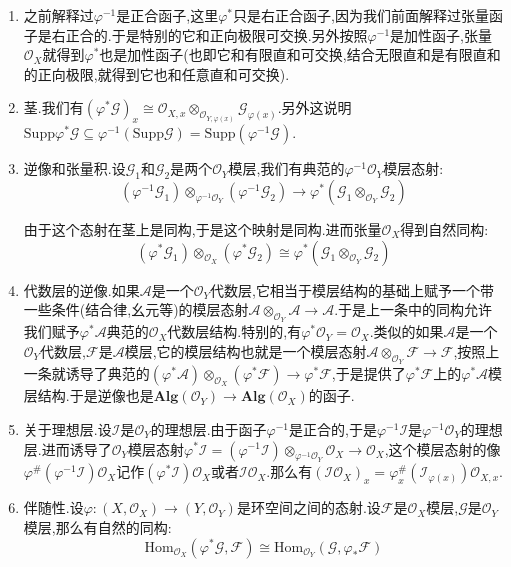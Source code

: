 \begin{enumerate}
	\item 之前解释过$\varphi^{-1}$是正合函子,这里$\varphi^*$只是右正合函子,因为我们前面解释过张量函子是右正合的.于是特别的它和正向极限可交换.另外按照$\varphi^{-1}$是加性函子,张量$\mathscr{O}_X$就得到$\varphi^*$也是加性函子(也即它和有限直和可交换,结合无限直和是有限直和的正向极限,就得到它也和任意直和可交换).
	\item 茎.我们有$(\varphi^*\mathscr{G})_x\cong\mathscr{O}_{X,x}\otimes_{\mathscr{O}_{Y,\varphi(x)}}\mathscr{G}_{\varphi(x)}$.另外这说明$\mathrm{Supp}\varphi^*\mathscr{G}\subseteq\varphi^{-1}(\mathrm{Supp}\mathscr{G})=\mathrm{Supp}(\varphi^{-1}\mathscr{G})$.
	\item 逆像和张量积.设$\mathscr{G}_1$和$\mathscr{G}_2$是两个$\mathscr{O}_Y$模层,我们有典范的$\varphi^{-1}\mathscr{O}_Y$模层态射:
	$$(\varphi^{-1}\mathscr{G}_1)\otimes_{\varphi^{-1}\mathscr{O}_Y}(\varphi^{-1}\mathscr{G}_2)\to\varphi^*(\mathscr{G}_1\otimes_{\mathscr{O}_Y}\mathscr{G}_2)$$
	
	由于这个态射在茎上是同构,于是这个映射是同构.进而张量$\mathscr{O}_X$得到自然同构:
	$$(\varphi^*\mathscr{G}_1)\otimes_{\mathscr{O}_X}(\varphi^*\mathscr{G}_2)\cong\varphi^*(\mathscr{G}_1\otimes_{\mathscr{O}_Y}\mathscr{G}_2)$$
	\item 代数层的逆像.如果$\mathscr{A}$是一个$\mathscr{O}_Y$代数层,它相当于模层结构的基础上赋予一个带一些条件(结合律,幺元等)的模层态射$\mathscr{A}\otimes_{\mathscr{O}_Y}\mathscr{A}\to\mathscr{A}$.于是上一条中的同构允许我们赋予$\varphi^*\mathscr{A}$典范的$\mathscr{O}_X$代数层结构.特别的,有$\varphi^*\mathscr{O}_Y=\mathscr{O}_X$.类似的如果$\mathscr{A}$是一个$\mathscr{O}_Y$代数层,$\mathscr{F}$是$\mathscr{A}$模层,它的模层结构也就是一个模层态射$\mathscr{A}\otimes_{\mathscr{O}_Y}\mathscr{F}\to\mathscr{F}$,按照上一条就诱导了典范的$(\varphi^*\mathscr{A})\otimes_{\mathscr{O}_X}(\varphi^*\mathscr{F})\to\varphi^*\mathscr{F}$,于是提供了$\varphi^*\mathscr{F}$上的$\varphi^*\mathscr{A}$模层结构.于是逆像也是$\textbf{Alg}(\mathscr{O}_Y)\to\textbf{Alg}(\mathscr{O}_X)$的函子.
	\item 关于理想层.设$\mathscr{I}$是$\mathscr{O}_Y$的理想层.由于函子$\varphi^{-1}$是正合的,于是$\varphi^{-1}\mathscr{I}$是$\varphi^{-1}\mathscr{O}_Y$的理想层.进而诱导了$\mathscr{O}_Y$模层态射$\varphi^*\mathscr{I}=(\varphi^{-1}\mathscr{I})\otimes_{\varphi^{-1}\mathscr{O}_Y}\mathscr{O}_X\to\mathscr{O}_X$,这个模层态射的像$\varphi^{\#}(\varphi^{-1}\mathscr{I})\mathscr{O}_X$记作$(\varphi^*\mathscr{I})\mathscr{O}_X$或者$\mathscr{I}\mathscr{O}_X$.那么有$(\mathscr{I}\mathscr{O}_X)_x=\varphi^{\#}_x(\mathscr{I}_{\varphi(x)})\mathscr{O}_{X,x}$.
	\item 伴随性.设$\varphi:(X,\mathscr{O}_X)\to(Y,\mathscr{O}_Y)$是环空间之间的态射.设$\mathscr{F}$是$\mathscr{O}_X$模层,$\mathscr{G}$是$\mathscr{O}_Y$模层,那么有自然的同构:
	$$\mathrm{Hom}_{\mathscr{O}_X}(\varphi^*\mathscr{G},\mathscr{F})\cong\mathrm{Hom}_{\mathscr{O}_Y}(\mathscr{G},\varphi_*\mathscr{F})$$
	

\end{enumerate}
